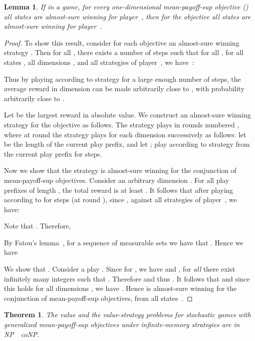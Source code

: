 \documentclass{article}
\newtheorem{theorem}{Theorem}
\newtheorem{lemma}{Lemma}
\begin{document}
\begin{lemma}\label{lem:all-one}
If in a game, for every one-dimensional mean-payoff-sup objective  ()
all states are almost-sure winning for player~,
then for the objective  
all states are almost-sure winning for player~.
\end{lemma}

\begin{proof}
To show this result, consider for each objective  an almost-sure winning 
strategy . Then for all , there exists a number of steps 
 such that for all ,  for all states , 
all dimensions , and all strategies 
of player~, we have~\cite[Lemma~1]{CDGO14}:

Thus by playing according to strategy  for a large enough number of steps, 
the average reward in dimension  can be made arbitrarily close to ,
with probability arbitrarily close to .


Let  be the 
largest reward in absolute value. We construct an almost-sure winning strategy  for the objective  
as follows. The strategy  plays in rounds numbered , where
at round  the strategy  plays for each dimension  successively as follows:
let  be the length of the current play prefix, and let ;
play according to strategy  from the current play prefix 
for  steps.

Now we show that the strategy  is almost-sure winning for the conjunction
of mean-payoff-sup objectives. Consider an arbitrary dimension . For all
play prefixes of length , the total reward is at least . 
It follows that after playing according to  for  steps (at round ), 
since , against all strategies  of player~, we have:


Note that .
Therefore,

By Fatou's lemma~\cite{Billingsley}, for a sequence  of measurable sets we have that 
.
Hence we have 



We show that . Consider a play .
Since for , we have  and , 
for \emph{all}  there exist infinitely many integers  such that 
.
Therefore 
and thus . It follows that 
 and since this holds 
for all dimensions , we have .
Hence  is almost-sure winning for the conjunction of mean-payoff-sup 
objectives, from all states~.
\end{proof}



\begin{theorem}\label{theo:mean-payoff-sup-infinite}
The value and the value-strategy problems for stochastic games 
with generalized mean-payoff-sup objectives under infinite-memory 
strategies are in NP~~coNP.
\end{theorem}
\end{document}
